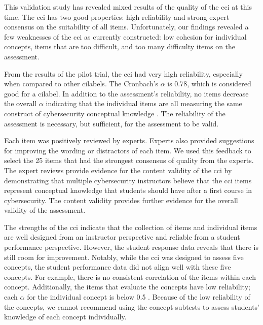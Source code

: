


This validation study has revealed mixed results of the quality of the \gls{cci} at this time. The \gls{cci} has two good properties: high reliability and strong expert consensus on the suitability of all items. Unfortunately, our findings revealed a few weaknesses of the \gls{cci} as currently constructed: low cohesion for individual concepts, items that are too difficult, and too many difficulty items on the assessment.

From the results of the pilot trial, the \gls{cci} had very high reliability, especially when compared to other \glspl{cilabel}. The Cronbach's $\alpha$ is 0.78, which is considered good for a \gls{cilabel}. In addition to the assessment's reliability, no items decrease the overall $\alpha$ indicating that the individual items are all measuring the same construct of cybersecurity conceptual knowledge \cite{dlci}. The reliability of the assessment is necessary, but sufficient, for the assessment to be valid.

Each item was positively reviewed by experts. Experts also provided suggestions for improving the wording or distractors of each item. We used this feedback to select the 25 items that had the strongest consensus of quality from the experts. The expert reviews provide evidence for the content validity of the \gls{cci} by demonstrating that multiple cybersecurity instructors believe that the \gls{cci} items represent conceptual knowledge that students should have after a first course in cybersecurity. The content validity provides further evidence for the overall validity of the assessment.


The strengths of the \gls{cci} indicate that the collection of items and individual items are well designed from an instructor perspective and reliable from a student performance perspective. However, the student response data reveals that there is still room for improvement. Notably, while the \gls{cci} was designed to assess five concepts, the student performance data did not align well with these five concepts. For example, there is no consistent correlation of the items within each concept. Additionally, the items that evaluate the concepts have low reliability; each $\alpha$ for the individual concept is below 0.5 \cite{jorian}. Because of the low reliability of the concepts, we cannot recommend using the concept subtests to assess students' knowledge of each concept individually.

